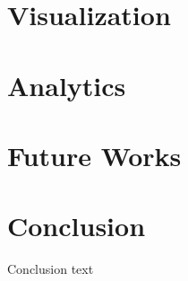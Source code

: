\documentclass[10pt,twocolumn,letterpaper]{article}
\begin{document}
\section{Visualization}



\section{Analytics}


\section{Future Works}

\section{Conclusion}
Conclusion text
\end{document}
